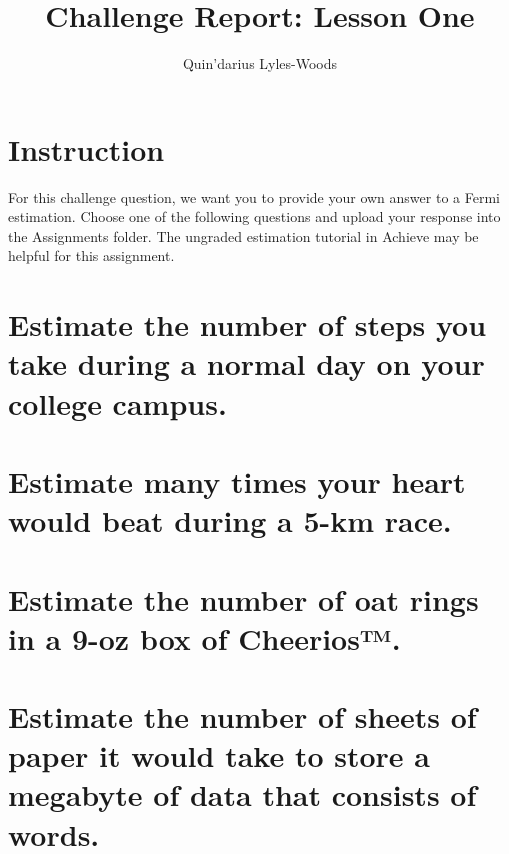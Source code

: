 \documentclass{article}
\title{Challenge Report: Lesson One}
\author{Quin'darius Lyles-Woods}
\begin{document}
\maketitle
\section*{Instruction}
For this challenge question, we want you to provide your own answer to a Fermi estimation. Choose one of the following questions and upload your response into the Assignments folder. The ungraded estimation tutorial in Achieve may be helpful for this assignment.

\section{Estimate the number of steps you take during a normal day on your college campus.}
\section{Estimate many times your heart would beat during a 5-km race.}
\section{Estimate the number of oat rings in a 9-oz box of Cheerios™.}
\section{Estimate the number of sheets of paper it would take to store a megabyte of data that consists of words.}
\end{document}
